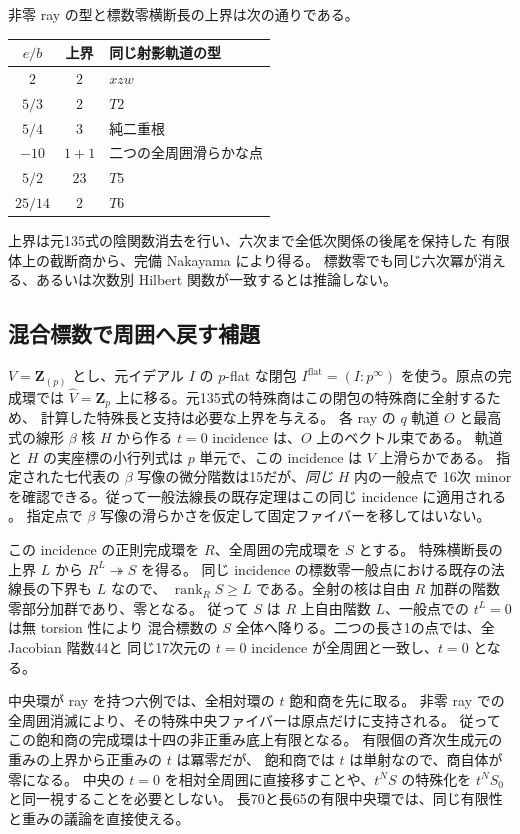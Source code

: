 \documentclass[11pt,a4paper]{ltjsarticle}
\DeclareMathOperator{\rank}{rank}
\theoremstyle{remark}
\begin{document}
非零 ray の型と標数零横断長の上界は次の通りである。
\begin{center}
\begin{tabular}{@{}ccl@{}}\toprule
$e/b$ & 上界 & 同じ射影軌道の型\\\midrule
$2$ & $2$ & $xzw$\\
$5/3$ & $2$ & $T2$\\
$5/4$ & $3$ & 純二重根\\
$-10$ & $1+1$ & 二つの全周囲滑らかな点\\
$5/2$ & $23$ & $T5$\\
$25/14$ & $2$ & $T6$\\\bottomrule
\end{tabular}
\end{center}
上界は元135式の陰関数消去を行い、六次まで全低次関係の後尾を保持した
有限体上の截断商から、完備 Nakayama により得る。
標数零でも同じ六次冪が消える、あるいは次数別 Hilbert 関数が一致するとは推論しない。

\subsection{混合標数で周囲へ戻す補題}
$V=\mathbf Z_{(p)}$ とし、元イデアル $I$ の $p$-flat な閉包
$I^{\mathrm{flat}}=(I:p^\infty)$ を使う。原点の完成環では
$\widehat V=\mathbf Z_p$ 上に移る。元135式の特殊商はこの閉包の特殊商に全射するため、
計算した特殊長と支持は必要な上界を与える。
各 ray の $q$ 軌道 $O$ と最高式の線形 $\beta$ 核 $H$ から作る
$t=0$ incidence は、$O$ 上のベクトル束である。
軌道と $H$ の実座標の小行列式は $p$ 単元で、この incidence は $V$ 上滑らかである。
指定された七代表の $\beta$ 写像の微分階数は15だが、\emph{同じ} $H$ 内の一般点で
16次 minor を確認できる。従って一般法線長の既存定理はこの同じ incidence に適用される
\cite{a-zero-geometry-v61}。
指定点で $\beta$ 写像の滑らかさを仮定して固定ファイバーを移してはいない。

この incidence の正則完成環を $R$、全周囲の完成環を $S$ とする。
特殊横断長の上界 $L$ から $R^L\twoheadrightarrow S$ を得る。
同じ incidence の標数零一般点における既存の法線長の下界も $L$ なので、
$\rank_R S\ge L$ である。全射の核は自由 $R$ 加群の階数零部分加群であり、零となる。
従って $S$ は $R$ 上自由階数 $L$、一般点での $t^L=0$ は無 torsion 性により
混合標数の $S$ 全体へ降りる。二つの長さ1の点では、全 Jacobian 階数44と
同じ17次元の $t=0$ incidence が全周囲と一致し、$t=0$ となる。

中央環が ray を持つ六例では、全相対環の $t$ 飽和商を先に取る。
非零 ray での全周囲消滅により、その特殊中央ファイバーは原点だけに支持される。
従ってこの飽和商の完成環は十四の非正重み底上有限となる。
有限個の斉次生成元の重みの上界から正重みの $t$ は冪零だが、
飽和商では $t$ は単射なので、商自体が零になる。
中央の $t=0$ を相対全周囲に直接移すことや、$t^N S$ の特殊化を
$t^N S_0$ と同一視することを必要としない。
長70と長65の有限中央環では、同じ有限性と重みの議論を直接使える。
\end{document}
